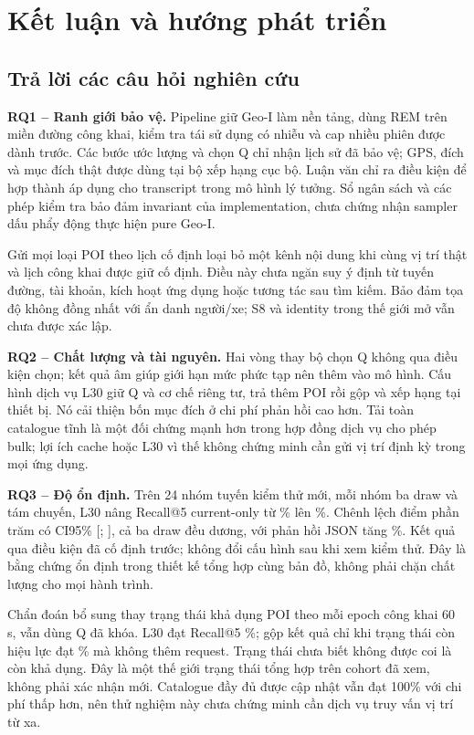 \chapter{Kết luận và hướng phát triển}
\label{ch:conclusions}

\section{Trả lời các câu hỏi nghiên cứu}

\textbf{RQ1 -- Ranh giới bảo vệ.} Pipeline giữ Geo-I làm nền tảng, dùng REM trên miền đường công khai, kiểm tra tái sử dụng có nhiễu và cap nhiều phiên được dành trước. Các bước ước lượng và chọn Q chỉ nhận lịch sử đã bảo vệ; GPS, đích và mục đích thật được dùng tại bộ xếp hạng cục bộ. Luận văn chỉ ra điều kiện để hợp thành áp dụng cho transcript trong mô hình lý tưởng. Sổ ngân sách và các phép kiểm tra bảo đảm invariant của implementation, chưa chứng nhận sampler dấu phẩy động thực hiện pure Geo-I.

Gửi mọi loại POI theo lịch cố định loại bỏ một kênh nội dung khi cùng vị trí thật và lịch công khai được giữ cố định. Điều này chưa ngăn suy ý định từ tuyến đường, tài khoản, kích hoạt ứng dụng hoặc tương tác sau tìm kiếm. Bảo đảm tọa độ không đồng nhất với ẩn danh người/xe; S8 và identity trong thế giới mở vẫn chưa được xác lập.

\textbf{RQ2 -- Chất lượng và tài nguyên.} Hai vòng thay bộ chọn Q không qua điều kiện chọn; kết quả âm giúp giới hạn mức phức tạp nên thêm vào mô hình. Cấu hình dịch vụ L30 giữ Q và cơ chế riêng tư, trả thêm POI rồi gộp và xếp hạng tại thiết bị. Nó cải thiện bốn mục đích ở chi phí phản hồi cao hơn. Tải toàn catalogue tĩnh là một đối chứng mạnh hơn trong hợp đồng dịch vụ cho phép bulk; lợi ích cache hoặc L30 vì thế không chứng minh cần gửi vị trí định kỳ trong mọi ứng dụng.

\textbf{RQ3 -- Độ ổn định.} Trên 24 nhóm tuyến kiểm thử mới, mỗi nhóm ba draw và tám chuyến, L30 nâng Recall@5 current-only từ \EvalFreshRecallBefore{}\% lên \EvalFreshRecallAfter{}\%. Chênh lệch \EvalFreshGain{} điểm phần trăm có CI95\% [\EvalFreshLow{}; \EvalFreshHigh{}], cả ba draw đều dương, với phản hồi JSON tăng \EvalReplyGrowth{}\%. Kết quả qua điều kiện đã cố định trước; không đổi cấu hình sau khi xem kiểm thử. Đây là bằng chứng ổn định trong thiết kế tổng hợp cùng bản đồ, không phải chặn chất lượng cho mọi hành trình.

Chẩn đoán bổ sung thay trạng thái khả dụng POI theo mỗi epoch công khai 60 s, vẫn dùng Q đã khóa. L30 đạt Recall@5 \EvalDynamicLThirtyCurrent{}\%; gộp kết quả chỉ khi trạng thái còn hiệu lực đạt \EvalDynamicLThirtyCached{}\% mà không thêm request. Trạng thái chưa biết không được coi là còn khả dụng. Đây là một thế giới trạng thái tổng hợp trên cohort đã xem, không phải xác nhận mới. Catalogue đầy đủ được cập nhật vẫn đạt 100\% với chi phí thấp hơn, nên thử nghiệm này chưa chứng minh cần dịch vụ truy vấn vị trí từ xa.

